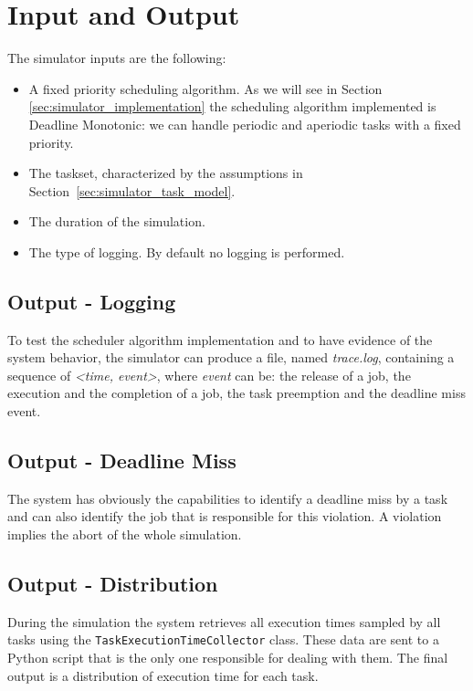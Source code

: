 \section{Input and Output}
The simulator inputs are the following:
\begin{itemize}
    \item A fixed priority scheduling algorithm. As we will see in Section \ref{sec:simulator_implementation} the scheduling algorithm implemented is Deadline Monotonic: we can handle periodic and aperiodic tasks with a fixed priority.
    \item The taskset, characterized by the assumptions in Section~\ref{sec:simulator_task_model}.
    \item The duration of the simulation.
    \item The type of logging. By default no logging is performed.
\end{itemize}

\subsection{Output - Logging}
To test the scheduler algorithm implementation and to have evidence of the system behavior, the simulator can produce a file, named \textit{trace.log}, containing a sequence of \textit{<time, event>}, where \textit{event} can be: the release of a job, the execution and the completion of a job, the task preemption and the deadline miss event.

\subsection{Output - Deadline Miss}
The system has obviously the capabilities to identify a deadline miss by a task and can also identify the job that is responsible for this violation. A violation implies the abort of the whole simulation.

\subsection{Output - Distribution}
During the simulation the system retrieves all execution times sampled by all tasks using the \texttt{TaskExecutionTimeCollector} class. These data are sent to a Python script that is the only one responsible for dealing with them. The final output is a distribution of execution time for each task.

